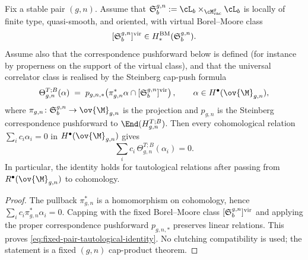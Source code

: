\begin{proposition}
\label{prop:fixed-pair-steinberg-cap-action}
Fix a stable pair $(g,n)$. Assume that
$\fS_b^{g,n}:=\cL_b\times_{\cM_{\mathrm{vac}}^g}\cL_b$
is locally of finite type, quasi-smooth, and oriented, with virtual
Borel--Moore class
\[
[\mathfrak{S}_b^{g,n}]^{\mathrm{vir}}
\in
H_*^{\mathrm{BM}}(\mathfrak{S}_b^{g,n}).
\]
Assume also that the correspondence pushforward below is defined
(for instance by properness on the support of the virtual class), and
that the universal correlator class is realised by the Steinberg
cap-push formula
\begin{equation}
\label{eq:steinberg-cap-action}
\Theta_{g,n}^{T;B}(\alpha)
\;=\;
p_{g,n,*}\!\left(
\pi_{g,n}^{*}\alpha
\cap
[\fS_b^{g,n}]^{\mathrm{vir}}
\right),
\qquad
\alpha\in H^\bullet(\ov{\M}_{g,n}),
\end{equation}
where
$\pi_{g,n}\colon \fS_b^{g,n}\to \ov{\M}_{g,n}$ is the projection and
$p_{g,n}$ is the Steinberg correspondence pushforward to
$\End(H_{g,n}^{T;B})$. Then every cohomological relation
$\sum_i c_i\alpha_i=0$ in $H^\bullet(\ov{\M}_{g,n})$ gives
\begin{equation}
\label{eq:fixed-pair-tautological-identity}
\sum_i c_i\,\Theta_{g,n}^{T;B}(\alpha_i)=0.
\end{equation}
In particular, the identity holds for tautological relations after
passing from $R^\bullet(\ov{\M}_{g,n})$ to cohomology.
\end{proposition}

\begin{proof}
The pullback $\pi_{g,n}^*$ is a homomorphism on cohomology, hence
$\sum_i c_i\pi_{g,n}^*\alpha_i=0$. Capping with the fixed
Borel--Moore class $[\mathfrak{S}_b^{g,n}]^{\mathrm{vir}}$ and applying the
proper correspondence pushforward $p_{g,n,*}$ preserves linear
relations. This proves \eqref{eq:fixed-pair-tautological-identity}.
No clutching compatibility is used; the statement is a fixed
$(g,n)$ cap-product theorem.
\end{proof}

